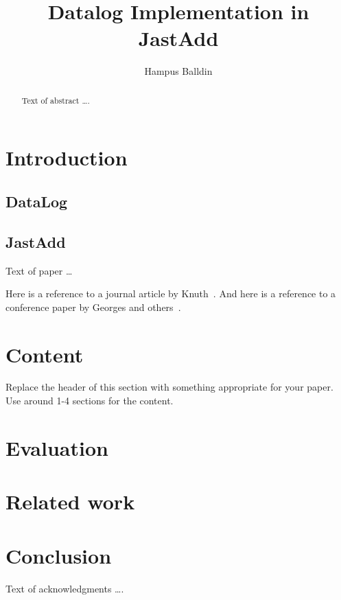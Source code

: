 \documentclass[sigplan,10pt]{acmart}
\begin{document}
\title[Short Title]{Datalog Implementation in JastAdd}         %



\author{Hampus Balldin}


\begin{abstract}
Text of abstract \ldots.
\end{abstract}


\maketitle


\section{Introduction}
\subsection{DataLog}
\subsection{JastAdd}

Text of paper \ldots

Here is a reference to a journal article by Knuth~\cite{Knuth68}. And here is a reference to a conference paper by Georges and others~\cite{GeorgesBE07}.

\lipsum[1-3] %

\section{Content}
Replace the header of this section with something appropriate for your paper. Use around 1-4 sections for the content.

\lipsum[4-10] %


\section{Evaluation}

\lipsum[11-13] %


\section{Related work}

\lipsum[14-15] %

\section{Conclusion}

\lipsum[16-17] %

\begin{acks}
Text of acknowledgments \ldots.
\end{acks}



\end{document}
